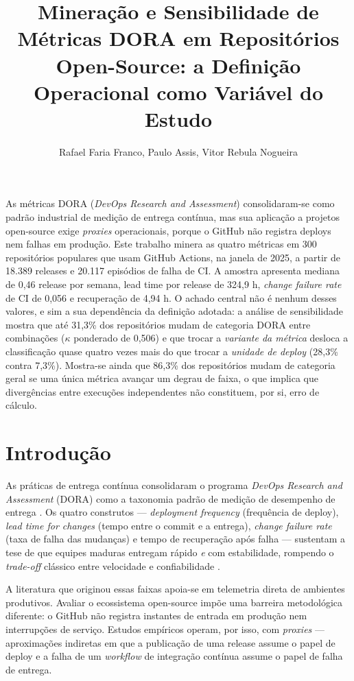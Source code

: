 \documentclass[12pt]{article}
\title{Mineração e Sensibilidade de Métricas DORA em Repositórios\\
       Open-Source: a Definição Operacional como Variável do Estudo}
\author{Rafael Faria Franco\inst{1}, Paulo Assis\inst{1}, Vitor Rebula Nogueira\inst{1}}
\begin{document}
\maketitle

\begin{resumo}
As métricas DORA (\emph{DevOps Research and Assessment}) consolidaram-se como padrão
industrial de medição de entrega contínua, mas sua aplicação a projetos open-source exige
\emph{proxies} operacionais, porque o GitHub não registra deploys nem falhas em produção.
Este trabalho minera as quatro métricas em 300 repositórios populares que usam GitHub
Actions, na janela de 2025, a partir de 18.389 releases e 20.117 episódios de falha de CI.
A amostra apresenta mediana de 0,46 release por semana, lead time por release de 324,9 h,
\emph{change failure rate} de CI de 0,056 e recuperação de 4,94 h. O achado central não é
nenhum desses valores, e sim a sua dependência da definição adotada: a análise de
sensibilidade mostra que até 31,3\% dos repositórios mudam de categoria DORA entre
combinações ($\kappa$ ponderado de 0,506) e que trocar a \emph{variante da métrica} desloca
a classificação quase quatro vezes mais do que trocar a \emph{unidade de deploy}
(28,3\% contra 7,3\%). Mostra-se ainda que 86,3\% dos repositórios mudam de categoria geral
se uma única métrica avançar um degrau de faixa, o que implica que divergências entre
execuções independentes não constituem, por si, erro de cálculo.
\end{resumo}

\section{Introdução}

As práticas de entrega contínua consolidaram o programa \emph{DevOps Research and
Assessment} (DORA) como a taxonomia padrão de medição de desempenho de entrega
\cite{forsgren2018}. Os quatro construtos --- \emph{deployment frequency}
(frequência de deploy), \emph{lead time for changes} (tempo entre o commit e a entrega),
\emph{change failure rate} (taxa de falha das mudanças) e tempo de recuperação após falha
--- sustentam a tese de que equipes maduras entregam rápido \emph{e} com
estabilidade, rompendo o \emph{trade-off} clássico entre velocidade e confiabilidade
\cite{dora2024}.

A literatura que originou essas faixas apoia-se em telemetria direta de ambientes
produtivos. Avaliar o ecossistema open-source impõe uma barreira metodológica diferente: o
GitHub não registra instantes de entrada em produção nem interrupções de serviço. Estudos
empíricos operam, por isso, com \emph{proxies} --- aproximações indiretas em que a
publicação de uma release assume o papel de deploy e a falha de um \emph{workflow} de
integração contínua assume o papel de falha de entrega.
\end{document}
